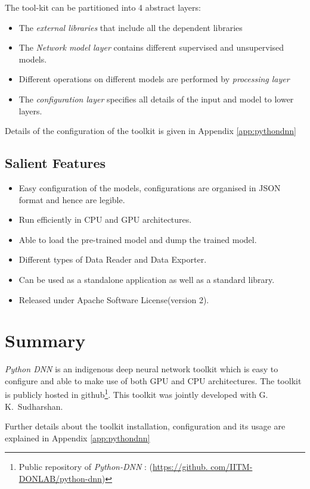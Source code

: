 \noindent The tool-kit can be partitioned into 4 abstract layers:
\begin{itemize}
\item The \textit{external libraries} that include all the dependent libraries
\item The \textit{Network model layer} contains different supervised and unsupervised models.
\item Different operations on different models are performed by \textit{processing layer}
\item The \textit{configuration layer} specifies all details of the input and model to lower layers.
\end{itemize}

Details of the configuration of the toolkit is given in Appendix \ref{app:pythondnn}

\subsection{Salient Features}
\label{sec:python-dnnFeatures}
\begin{itemize}
\item Easy configuration of the models, configurations
are organised in JSON format and hence are legible.
\item Run efficiently in CPU and GPU architectures.
\item Able to load the pre-trained model and dump the trained model.
\item Different types of Data Reader and Data Exporter.
\item Can be used as a standalone application as well as a standard  library.
\item Released under Apache Software License(version 2).\\
\end{itemize}

\section{Summary}
\textit{Python DNN} is an indigenous deep neural network toolkit which is easy to configure and able to make use of both GPU and CPU architectures.  The toolkit is publicly hosted in github\footnote{Public repository of \textit{Python-DNN} : (\url{https://github.  com/IITM-DONLAB/python-dnn})}.  This toolkit was jointly developed with G.~ K.~Sudharshan.

Further details about the toolkit installation, configuration and its usage are explained in Appendix \ref{app:pythondnn}
